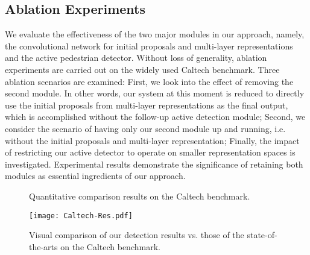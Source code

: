 \documentclass[10pt,journal,compsoc,twoside]{IEEEtran}
\begin{document}
\subsection{Ablation Experiments}
We evaluate the effectiveness of the two major modules in our approach, namely,
the convolutional network for initial proposals and multi-layer representations and the active pedestrian detector.
Without loss of generality, ablation experiments are carried out on the widely used Caltech benchmark.
Three ablation scenarios are examined:
First, we look into the effect of removing the second module.
In other words, our system at this moment is reduced to directly use the initial proposals from multi-layer representations as the final output,
which is accomplished without the follow-up active detection module;
Second, we consider the scenario of having only our second module up and running, i.e. without the initial proposals and multi-layer representation;
Finally, the impact of restricting our active detector to operate on smaller representation spaces is investigated.
Experimental results demonstrate the significance of retaining both modules as essential ingredients of our approach.


\begin{figure*}[!t]
\centering
{}
\caption{Quantitative comparison results on the Caltech benchmark.}
\label{fig_13}
\end{figure*}

\begin{figure}[!t]
\centering
\texttt{[image: Caltech-Res.pdf]}\\
\caption{Visual comparison of our detection results vs. those of the state-of-the-arts on the Caltech benchmark.}
\label{fig_Caltech_CompareRes}
\end{figure}
\end{document}
